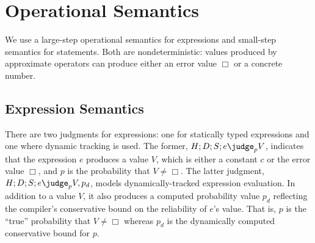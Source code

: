 \section{Operational Semantics}

We use a large-step operational semantics for expressions and small-step
semantics for statements.
Both are nondeterministic: values produced by approximate operators can
produce either an error value $\Box$ or a concrete number.

\subsection{Expression Semantics}

There are two judgments for expressions: one for statically typed
expressions and one where dynamic tracking is used.
The former, $H ; D ; S ;  e \pjudge{p} V$, indicates that the expression
$e$ produces a value $V$, which is either a
constant $c$ or the error value $\Box$, and $p$ is the
probability that $V \ne \Box$.
The latter judgment, $H ; D ; S ; e \pjudge{p} V, p_d$, models
dynamically-tracked expression evaluation. In addition to a value $V$, it also produces a computed
probability value $p_d$ reflecting the compiler's conservative bound on
the reliability of $e$'s value.
That is, $p$ is the ``true'' probability that $V \ne \Box$ whereas
$p_d$ is the dynamically computed conservative bound for $p$.

